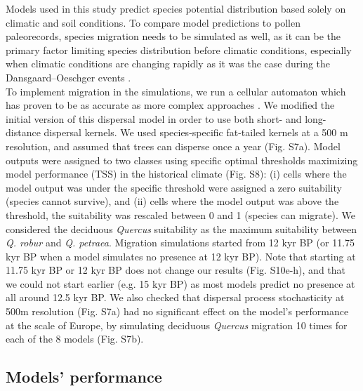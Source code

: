 \documentclass[9pt,twocolumn,twoside]{pnas-new}
\newcommand{\textappr}{\raisebox{0.5ex}{\texttildelow}}
\begin{document}
{Models used in this study predict species potential distribution based solely on climatic and soil conditions. To compare model predictions to pollen paleorecords, species migration needs to be simulated as well, as it can be the primary factor limiting species distribution before climatic conditions, especially when climatic conditions are changing rapidly as it was the case during the Dansgaard–Oeschger events \cite{Svenning2004, Saltre2013}.  \\
To implement migration in the simulations, we run a  cellular automaton \cite{Engler2012} which has proven to be as accurate as more complex approaches \cite{Zurell2016}. We modified the initial version of this dispersal model in order to use both short- and long-distance dispersal kernels. We used species-specific fat-tailed kernels \cite{Zani2022} at a 500 m resolution, and assumed that trees can disperse once a year (Fig. S7a). Model outputs were assigned to two classes using specific optimal thresholds maximizing model performance (TSS) in the historical climate (Fig. S8): (i) cells where the model output was under the specific threshold were assigned a zero suitability (species cannot survive), and (ii) cells where the  model output was above the threshold, the suitability was rescaled between 0 and 1 (species can migrate). We considered the deciduous \emph{Quercus} suitability as the maximum suitability between \emph{Q. robur} and \emph{Q. petraea}. Migration simulations started from 12 kyr BP (or 11.75 kyr BP when a model simulates no presence at 12 kyr BP). Note that starting at 11.75 kyr BP or 12 kyr BP does not change our results (Fig. S10e-h), and that we could not start earlier (e.g. \textappr15 kyr BP) as most models predict no presence at all around 12.5 kyr BP. We also checked that dispersal process stochasticity at 500m resolution (Fig. S7a) had no significant effect on the model's performance at the scale of Europe, by simulating deciduous \emph{Quercus} migration 10 times for each of the 8 models (Fig. S7b). 

\subsection*{Models' performance}\label{skill}

}
\end{document}
